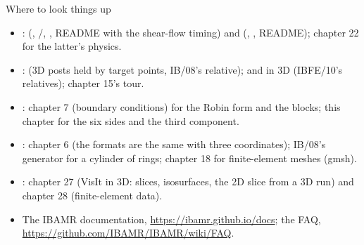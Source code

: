 \documentclass[aspectratio=169,11pt]{beamer}
\begin{document}
\begin{frame}{Where to look things up}
\label{fr:lookup}
\small
\begin{itemize}
  \item {}:  (, /, , README with the shear-flow timing) and  (, , README); chapter 22 for the latter's physics.
  \item {}:  (3D posts held by target points, IB/08's relative);  and  in 3D (IBFE/10's relatives); chapter 15's tour.
  \item {}: chapter 7 (boundary conditions) for the Robin form and the  blocks; this chapter for the six sides and the third component.
  \item {}: chapter 6 (the formats are the same with three coordinates); IB/08's generator for a cylinder of rings; chapter 18 for finite-element meshes (gmsh).
  \item {}: chapter 27 (VisIt in 3D: slices, isosurfaces, the 2D slice from a 3D run) and chapter 28 (finite-element data).
  \item The IBAMR documentation, \url{https://ibamr.github.io/docs}; the FAQ, \url{https://github.com/IBAMR/IBAMR/wiki/FAQ}.
\end{itemize}
\end{frame}
\end{document}
